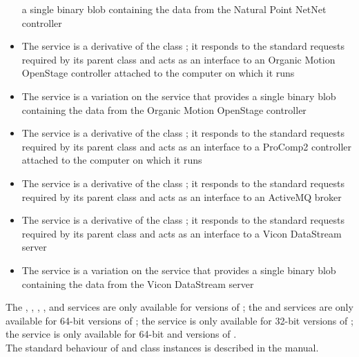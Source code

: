 \begin{itemize}
a single binary blob containing the data from the Natural Point NetNet controller
\item\exSp{}The \textbf{\OSI} service is a derivative of the \mplusm{} class
;
it responds to the standard requests required by its parent class and acts as an interface
to an Organic Motion OpenStage controller attached to the computer on which it runs
\item\exSp{}The \textbf{\OSBI} service is a variation on the \OSI{} service that provides
a single binary blob containing the data from the Organic Motion OpenStage controller
\item\exSp{}The \textbf{\PCtwoI} service is a derivative of the \mplusm{} class
;
it responds to the standard requests required by its parent class and acts as an interface
to a ProComp2 controller attached to the computer on which it runs
\item\exSp{}The \textbf{\SMO} service is a derivative of the \mplusm{} class
;
it responds to the standard requests required by its parent class and acts as an interface
to an ActiveMQ broker
\item\exSp{}The \textbf{\VDSI} service is a derivative of the \mplusm{} class
;
it responds to the standard requests required by its parent class and acts as an interface
to a Vicon DataStream server
\item\exSp{}The \textbf{\VBI} service is a variation on the \VDSI{} service that provides
a single binary blob containing the data from the Vicon DataStream server
\end{itemize}

The \KVtwoI, \KVtwoBI, \NNI, \NNBI, \VDSI{} and \VBI{} services are only available for
\win{} versions of \mplusm;
the \OSI{} and \OSBI{} services are only available for \win{} 64-bit versions of \mplusm;
the \PCtwoI{} service is only available for \win{} 32-bit versions of \mplusm;
the \SMO{} service is only available for \win{} 64-bit and \osx{} versions of \mplusm.\\

The standard behaviour of  and 
class instances is described in the \emph{\MMM} manual.
\primaryEnd{}
